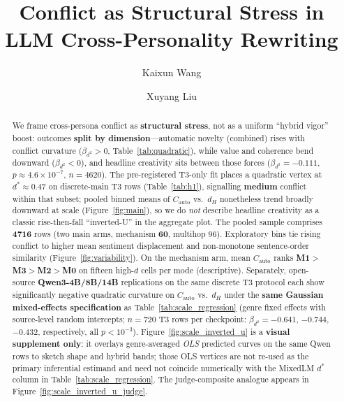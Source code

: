 \documentclass[sigconf,nonacm]{acmart}
\title[Conflict as Structural Stress in LLM Cross-Personality Rewriting]{Conflict as Structural Stress in LLM Cross-Personality Rewriting}
\author{Kaixun Wang}
\author{Xuyang Liu}
\affiliation{
  \institution{Southern University of Science and Technology}
  \city{Shenzhen}
  \country{China}
}
\begin{document}
\begin{abstract}
We frame cross-persona conflict as \textbf{structural stress}, not as a uniform ``hybrid vigor'' boost: outcomes \textbf{split by dimension}---automatic novelty (combined) rises with conflict curvature ($\beta_{d^2}{>}0$, Table~\ref{tab:quadratic}), while value and coherence bend downward ($\beta_{d^2}{<}0$), and headline creativity sits between those forces ($\beta_{d^2}{=}{-}0.111$, $p{\approx}4.6{\times}10^{-7}$, $n{=}4620$).
The pre-registered T3-only fit places a quadratic vertex at $d^\ast{\approx}0.47$ on discrete-main T3 rows (Table~\ref{tab:h1}), signalling \textbf{medium} conflict within that subset; pooled binned means of $C_{\mathrm{auto}}$ vs.\ $d_H$ nonetheless trend broadly downward at scale (Figure~\ref{fig:main}), so we do \emph{not} describe headline creativity as a classic rise-then-fall ``inverted-U'' in the aggregate plot.
The pooled sample comprises \textbf{4716} rows (two main arms, mechanism \textbf{60}, multihop 96). Exploratory bins tie rising conflict to higher mean sentiment displacement and non-monotone sentence-order similarity (Figure~\ref{fig:variability}). On the mechanism arm, mean $C_{\mathrm{auto}}$ ranks \textbf{M1}${>}$\textbf{M3}${>}$\textbf{M2}${>}$\textbf{M0} on fifteen high-$d$ cells per mode (descriptive).
Separately, open-source \textbf{Qwen3-4B/8B/14B} replications on the same discrete T3 protocol each show significantly negative quadratic curvature on $C_{\mathrm{auto}}$ vs.\ $d_H$ under the \textbf{same Gaussian mixed-effects specification} as Table~\ref{tab:scale_regression} (genre fixed effects with source-level random intercepts; $n{=}720$ T3 rows per checkpoint: $\beta_{d^2}{=}{-}0.641$, $-0.744$, $-0.432$, respectively, all $p{<}10^{-3}$).
Figure~\ref{fig:scale_inverted_u} is a \textbf{visual supplement only}: it overlays genre-averaged \emph{OLS} predicted curves on the same Qwen rows to sketch shape and hybrid bands; those OLS vertices are not re-used as the primary inferential estimand and need not coincide numerically with the MixedLM $d^\ast$ column in Table~\ref{tab:scale_regression}.
The judge-composite analogue appears in Figure~\ref{fig:scale_inverted_u_judge}.
\end{abstract}


\maketitle
\end{document}
